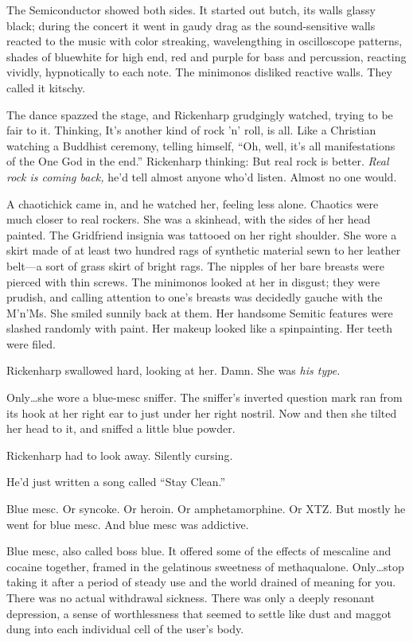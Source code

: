 The Semiconductor showed both sides. It started out butch, its walls glassy black; during the concert it went in gaudy drag as the sound-sensitive walls reacted to the music with color streaking, wavelengthing in oscilloscope patterns, shades of bluewhite for high end, red and purple for bass and percussion, reacting vividly, hypnotically to each note. The minimonos disliked reactive walls. They called it kitschy.

The dance spazzed the stage, and Rickenharp grudgingly watched, trying to be fair to it. Thinking, It's another kind of rock 'n' roll, is all. Like a Christian watching a Buddhist ceremony, telling himself, ``Oh, well, it's all manifestations of the One God in the end.'' Rickenharp thinking: But real rock is better. \textit{Real rock is coming back,} he'd tell almost anyone who'd listen. Almost no one would.

A chaotichick came in, and he watched her, feeling less alone. Chaotics were much closer to real rockers. She was a skinhead, with the sides of her head painted. The Gridfriend insignia was tattooed on her right shoulder. She wore a skirt made of at least two hundred rags of synthetic material sewn to her leather belt---a sort of grass skirt of bright rags. The nipples of her bare breasts were pierced with thin screws. The minimonos looked at her in disgust; they were prudish, and calling attention to one's breasts was decidedly gauche with the M'n'Ms. She smiled sunnily back at them. Her handsome Semitic features were slashed randomly with paint. Her makeup looked like a spinpainting. Her teeth were filed.

Rickenharp swallowed hard, looking at her. Damn. She was \textit{his type.}

Only\ldots she wore a blue-mesc sniffer. The sniffer's inverted question mark ran from its hook at her right ear to just under her right nostril. Now and then she tilted her head to it, and sniffed a little blue powder.

Rickenharp had to look away. Silently cursing.

He'd just written a song called ``Stay Clean.''

Blue mesc. Or syncoke. Or heroin. Or amphetamorphine. Or XTZ. But mostly he went for blue mesc. And blue mesc was addictive.

Blue mesc, also called boss blue. It offered some of the effects of mescaline and cocaine together, framed in the gelatinous sweetness of methaqualone. Only\ldots stop taking it after a period of steady use and the world drained of meaning for you. There was no actual withdrawal sickness. There was only a deeply resonant depression, a sense of worthlessness that seemed to settle like dust and maggot dung into each individual cell of the user's body.

